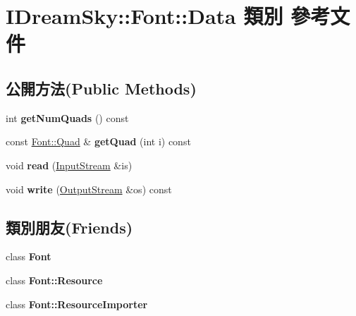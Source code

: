 \hypertarget{class_i_dream_sky_1_1_font_1_1_data}{}\section{I\+Dream\+Sky\+:\+:Font\+:\+:Data 類別 參考文件}
\label{class_i_dream_sky_1_1_font_1_1_data}
\subsection*{公開方法(Public Methods)}
\begin{DoxyCompactItemize}
\item 
int {\bfseries get\+Num\+Quads} () const \hypertarget{class_i_dream_sky_1_1_font_1_1_data_a4d13c583437adea6462846e051424389}{}\label{class_i_dream_sky_1_1_font_1_1_data_a4d13c583437adea6462846e051424389}

\item 
const \hyperlink{class_i_dream_sky_1_1_font_1_1_quad}{Font\+::\+Quad} \& {\bfseries get\+Quad} (int i) const \hypertarget{class_i_dream_sky_1_1_font_1_1_data_a6fd9fd60bfb655331a77222a184983fe}{}\label{class_i_dream_sky_1_1_font_1_1_data_a6fd9fd60bfb655331a77222a184983fe}

\item 
void {\bfseries read} (\hyperlink{class_i_dream_sky_1_1_input_stream}{Input\+Stream} \&is)\hypertarget{class_i_dream_sky_1_1_font_1_1_data_a6b1fcfa12684b6bef6709dc16d1c0c77}{}\label{class_i_dream_sky_1_1_font_1_1_data_a6b1fcfa12684b6bef6709dc16d1c0c77}

\item 
void {\bfseries write} (\hyperlink{class_i_dream_sky_1_1_output_stream}{Output\+Stream} \&os) const \hypertarget{class_i_dream_sky_1_1_font_1_1_data_a6bd8d434323ba4560a117d608f63fb43}{}\label{class_i_dream_sky_1_1_font_1_1_data_a6bd8d434323ba4560a117d608f63fb43}

\end{DoxyCompactItemize}
\subsection*{類別朋友(Friends)}
\begin{DoxyCompactItemize}
\item 
class {\bfseries Font}\hypertarget{class_i_dream_sky_1_1_font_1_1_data_ad564b94b59dc295de3dfc4415d95cca8}{}\label{class_i_dream_sky_1_1_font_1_1_data_ad564b94b59dc295de3dfc4415d95cca8}

\item 
class {\bfseries Font\+::\+Resource}\hypertarget{class_i_dream_sky_1_1_font_1_1_data_aed1576435da2fd6be67b0972d456c130}{}\label{class_i_dream_sky_1_1_font_1_1_data_aed1576435da2fd6be67b0972d456c130}

\item 
class {\bfseries Font\+::\+Resource\+Importer}\hypertarget{class_i_dream_sky_1_1_font_1_1_data_adcf31f02b1c16e69102f4d80f9a06dfd}{}\label{class_i_dream_sky_1_1_font_1_1_data_adcf31f02b1c16e69102f4d80f9a06dfd}

\end{DoxyCompactItemize}


